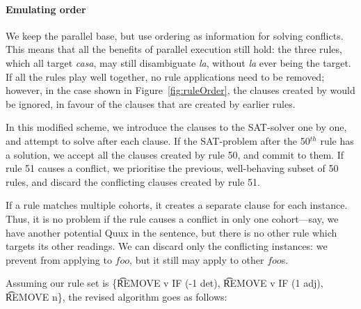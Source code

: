 \paragraph{Emulating order} 

We keep the parallel base, but use ordering as information for solving conflicts.
This means that all the benefits of parallel execution still hold: the three rules, which all target \emph{casa}, may still disambiguate \emph{la}, without \emph{la} ever being the target.
If all the rules play well together, no rule applications need to be removed; 
however, in the case shown in Figure~\ref{fig:ruleOrder}, the clauses created by 
 would be ignored, in favour of the clauses that are created by earlier rules.




In this modified scheme, we introduce the clauses to the SAT-solver one by one, 
and attempt to solve after each clause. If the SAT-problem after the 50$^{th}$ rule 
has a solution, we accept all the clauses created by rule 50, and commit to them.
If rule 51 causes a conflict, we prioritise the previous, well-behaving subset of
50 rules, and discard the conflicting clauses created by rule 51.

If a rule matches multiple cohorts, it creates a separate clause for each instance.
Thus, it is no problem if the rule causes a conflict in only one cohort---say, we 
have another potential Quux in the sentence, but there is no other rule which targets 
its other readings. We can discard only the conflicting instances: we prevent 
 from applying to $foo$, but it still may apply to other $foo$s.


Assuming our rule set is \{\t{REMOVE v IF (-1 det)}, \t{REMOVE v IF (1 adj)}, \t{REMOVE n}\}, the revised algorithm goes as follows:


